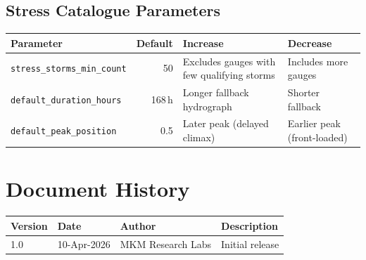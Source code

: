 \documentclass[11pt,a4paper]{article}
\begin{document}
\subsection{Stress Catalogue Parameters}

\begin{longtable}{p{4.8cm}rp{3.5cm}p{3.5cm}}
\toprule
\textbf{Parameter} & \textbf{Default} & \textbf{Increase} & \textbf{Decrease} \\
\midrule
\texttt{stress\_storms\_min\_count} & 50 &
  Excludes gauges with few qualifying storms &
  Includes more gauges \\[4pt]
\texttt{default\_duration\_hours} & 168\,h &
  Longer fallback hydrograph &
  Shorter fallback \\[4pt]
\texttt{default\_peak\_position} & 0.5 &
  Later peak (delayed climax) &
  Earlier peak (front-loaded) \\
\bottomrule
\end{longtable}


\section*{Document History}

\begin{tabular}{llll}
\toprule
\textbf{Version} & \textbf{Date} & \textbf{Author} & \textbf{Description} \\
\midrule
1.0 & 10-Apr-2026 & MKM Research Labs & Initial release \\
\bottomrule
\end{tabular}
\end{document}
